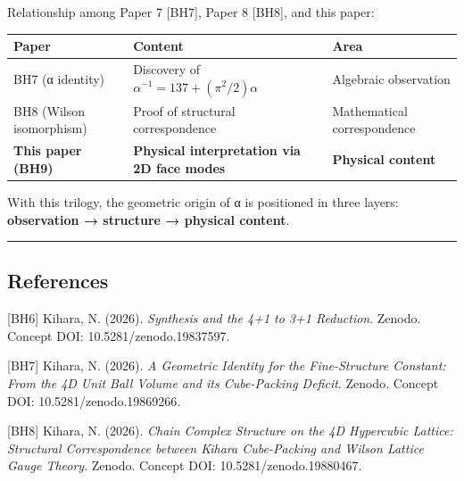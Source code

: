 \documentclass[
  11pt]{article}
\newcounter{none} %
\begin{document}
Relationship among Paper 7 {[}BH7{]}, Paper 8 {[}BH8{]}, and this paper:

{\def\LTcaptype{none} %
\begin{longtable}[]{@{}
  >{\raggedright\arraybackslash}p{}
  >{\raggedright\arraybackslash}p{}
  >{\raggedright\arraybackslash}p{}@{}}
\toprule\noalign{}
\begin{minipage}[b]{\linewidth}\raggedright
Paper
\end{minipage} & \begin{minipage}[b]{\linewidth}\raggedright
Content
\end{minipage} & \begin{minipage}[b]{\linewidth}\raggedright
Area
\end{minipage} \\
\midrule\noalign{}
\endhead
\bottomrule\noalign{}
\endlastfoot
BH7 (α identity) & Discovery of \(\alpha^{-1} = 137 + (\pi^2/2)\alpha\)
& Algebraic observation \\
BH8 (Wilson isomorphism) & Proof of structural correspondence &
Mathematical correspondence \\
\textbf{This paper (BH9)} & \textbf{Physical interpretation via 2D face
modes} & \textbf{Physical content} \\
\end{longtable}
}

With this trilogy, the geometric origin of α is positioned in three
layers: \textbf{observation → structure → physical content}.

\begin{center}\rule{0.5\linewidth}{0.5pt}\end{center}

\subsection{References}\label{references}

{[}BH6{]} Kihara, N. (2026). \emph{Synthesis and the 4+1 to 3+1
Reduction}. Zenodo. Concept DOI: 10.5281/zenodo.19837597.

{[}BH7{]} Kihara, N. (2026). \emph{A Geometric Identity for the
Fine-Structure Constant: From the 4D Unit Ball Volume and its
Cube-Packing Deficit}. Zenodo. Concept DOI: 10.5281/zenodo.19869266.

{[}BH8{]} Kihara, N. (2026). \emph{Chain Complex Structure on the 4D
Hypercubic Lattice: Structural Correspondence between Kihara
Cube-Packing and Wilson Lattice Gauge Theory}. Zenodo. Concept DOI:
10.5281/zenodo.19880467.
\end{document}
